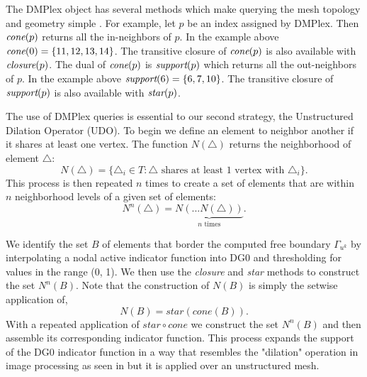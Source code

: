 \documentclass[]{interact}
\theoremstyle{plain}%
\theoremstyle{definition}
\theoremstyle{remark}
\begin{document}
The DMPlex object has several methods which make querying the mesh topology and geometry simple \citep{Langeetal2016}. For example, let $p$ be an index assigned by DMPlex. Then $\emph{cone}(p)$ returns all the in-neighbors of $p$. In the example above $\emph{cone}(0) = \{11, 12, 13, 14\}$. The transitive closure of $\emph{cone}(p)$ is also available with $\emph{closure}(p)$. The dual of $\emph{cone}(p)$ is $\emph{support}(p)$ which returns all the out-neighbors of $p$. In the example above $\emph{support}(6) = \{6, 7, 10\}$. The transitive closure of $\emph{support}(p)$ is also available with $\emph{star}(p)$. 

The use of DMPlex queries is essential to our second strategy, the Unstructured Dilation Operator (UDO). To begin we define an element to neighbor another if it shares at least one vertex. The function $N(\triangle)$ returns the neighborhood of element $\triangle$:
\begin{equation}
  N(\triangle) = \{\triangle_i \in T: \triangle \text{ shares at least 1 vertex with } \triangle_i\}.
\end{equation}
This process is then repeated $n$ times to create a set of elements that are within $n$ neighborhood levels of a given set of elements:
\begin{equation}
  N^n(\triangle) = \underbrace{N(...N(\triangle))}_{n \text{ times}}.
\end{equation}

We identify the set $B$ of elements that border the computed free boundary $\Gamma_{u^k}$ by interpolating a nodal active indicator function into DG0 and thresholding for values in the range (0, 1). We then use the \emph{closure} and \emph{star} methods to construct the set $N^n(B)$. Note that the construction of $N(B)$ is simply the setwise application of,
\begin{equation}
  N(B) = star(cone(B)).
\end{equation} 
With a repeated application of $star \circ cone$ we construct the set $N^n(B)$ and then assemble its corresponding indicator function. This process expands the support of the DG0 indicator function in a way that resembles the "dilation" operation in image processing as seen in \citep{OpenCV} but it is applied over an unstructured mesh.
\end{document}
